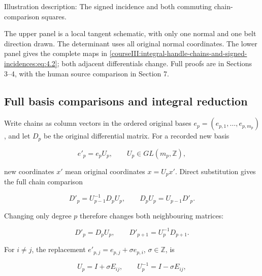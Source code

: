 Illustration description: The signed incidence and both commuting chain-comparison squares.

The upper panel is a local tangent schematic, with only one normal and one belt direction drawn. The determinant uses all original normal coordinates. The lower panel gives the complete maps in \eqref{courseIII:integral-handle-chains-and-signed-incidences:eq:4.2}; both adjacent differentials change. Full proofs are in Sections 3--4, with the human source comparison in Section 7.

\subsection{Full basis comparisons and integral reduction}
\label{courseIII:integral-handle-chains-and-signed-incidences:handle-integral-bases}

\label{courseIII:integral-handle-chains-and-signed-incidences:section-4}\label{courseIII:handle-chains:4}

Write chains as column vectors in the ordered original bases \(e_p=(e_{p,1},\ldots,e_{p,m_p})\), and let \(D_p\) be the original differential matrix. For a recorded new basis

\begin{equation}
e'_p=e_pU_p,\qquad U_p\in GL(m_p,\mathbb Z),
 \label{courseIII:integral-handle-chains-and-signed-incidences:eq:4.1}
\end{equation}

new coordinates \(x'\) mean original coordinates \(x=U_px'\). Direct substitution gives the full chain comparison

\begin{equation}
D'_p=U_{p-1}^{-1}D_pU_p,\qquad
 D_pU_p=U_{p-1}D'_p.
 \label{courseIII:integral-handle-chains-and-signed-incidences:eq:4.2}
\end{equation}

Changing only degree \(p\) therefore changes both neighbouring matrices:

\begin{equation}
D'_p=D_pU_p,\qquad D'_{p+1}=U_p^{-1}D_{p+1}.
 \label{courseIII:integral-handle-chains-and-signed-incidences:eq:4.3}
\end{equation}

For \(i\ne j\), the replacement \(e'_{p,j}=e_{p,j}+\sigma e_{p,i}\), \(\sigma\in\mathbb Z\), is

\begin{equation}
U_p=I+\sigma E_{ij},\qquad U_p^{-1}=I-\sigma E_{ij},
 \label{courseIII:integral-handle-chains-and-signed-incidences:eq:4.4}
\end{equation}

